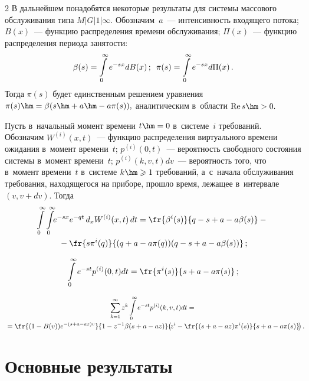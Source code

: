 \begin{multicols}{2}
В дальнейшем понадобятся некоторые результаты для системы 
массового обслуживания типа $M|G|1|\infty.$
Обозначим~$a$~--- интенсивность входящего потока; $B(x)$~--- 
функцию распределения времени обслуживания; 
$\Pi(x)$~--- функцию распределения периода занятости:
$$
\beta(s)=\int\limits_0^{\infty}e^{-sx}dB(x)\,;\enskip 
\pi(s)=\int\limits_0^{\infty}e^{-sx}d\Pi(x)\,.
$$
Тогда $\pi(s)$ будет единственным решением уравнения 
$\pi(s)\hm=\beta(s\hm+a\hm-a\pi(s)),$ аналитическим в~области $\mathrm{Re}\, s\hm>0.$

Пусть в~начальный момент времени $t\hm=0$  в~сис\-те\-ме~$i$ требований. 
Обозначим $W^{(i)}(x,t)$~--- функцию распределения виртуального 
времени ожидания в~момент времени~$t$; $p^{(i)}(0,t)$~--- вероятность 
свободного состояния системы в~момент времени~$t$; $p^{(i)}(k,v,t)dv$~--- 
вероятность того, что в~момент времени~$t$ в~системе 
$k\hm\geqslant 1$ требований, а~с~начала обслуживания требования, 
находящегося на приборе, прошло время, лежащее в~интервале $(v,v+dv).$
Тогда
\begin{multline}
\label{n1}
\hspace*{-1.80583pt}\int\limits_0^{\infty}\int\limits_0^{\infty}\!\!e^{-sx}e^{-qt}\,d_xW^{(i)}
(x,t)\,dt=\fr{\beta^i(s)}{q-s+a-a\beta(s)}-{}\\
{}-
\fr{s\pi^i(q)}{(q+a-a\pi(q))(q-s+a-a\beta(s))}\,;
\end{multline}


\noindent
\begin{equation*}
\int\limits_0^{\infty}e^{-st}p^{(i)}(0,t)dt=\fr{\pi^i(s)}{s+a-a\pi(s)}\,;
\end{equation*}

\vspace*{-18pt}

\noindent
\begin{multline*}
\sum\limits_{k=1}^{\infty}z^k\int\limits_0^{\infty}
e^{-st}p^{(i)}(k,v,t)dt={}\\[-2pt]
{}=\fr{(1-B(v))e^{-(s+a-az)v}}{1-z^{-1}\beta(s+a-az)}
\!\left(\!z^i-\fr{(s+a-az)\pi^i(s)}{s+a-a\pi(s)}\!\right).\hspace*{-4.77934pt}
\end{multline*}

\vspace*{-15pt}


\section{Основные результаты}


\end{multicols}
